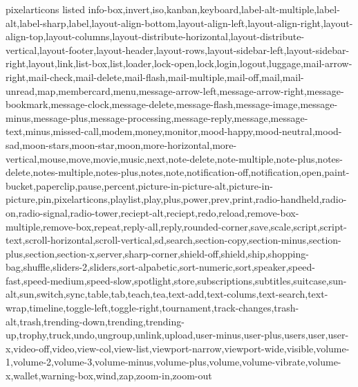 \documentclass[aspectratio=169,t]{beamer}
\begin{document}
\begin{frame}[allowframebreaks]{pixelarticons listed}
{info-box,invert,iso,kanban,keyboard,label-alt-multiple,label-alt,label-sharp,label,layout-align-bottom,layout-align-left,layout-align-right,layout-align-top,layout-columns,layout-distribute-horizontal,layout-distribute-vertical,layout-footer,layout-header,layout-rows,layout-sidebar-left,layout-sidebar-right,layout,link,list-box,list,loader,lock-open,lock,login,logout,luggage,mail-arrow-right,mail-check,mail-delete,mail-flash,mail-multiple,mail-off,mail,mail-unread,map,membercard,menu,message-arrow-left,message-arrow-right,message-bookmark,message-clock,message-delete,message-flash,message-image,message-minus,message-plus,message-processing,message-reply,message,message-text,minus,missed-call,modem,money,monitor,mood-happy,mood-neutral,mood-sad,moon-stars,moon-star,moon,more-horizontal,more-vertical,mouse,move,movie,music,next,note-delete,note-multiple,note-plus,notes-delete,notes-multiple,notes-plus,notes,note,notification-off,notification,open,paint-bucket,paperclip,pause,percent,picture-in-picture-alt,picture-in-picture,pin,pixelarticons,playlist,play,plus,power,prev,print,radio-handheld,radio-on,radio-signal,radio-tower,reciept-alt,reciept,redo,reload,remove-box-multiple,remove-box,repeat,reply-all,reply,rounded-corner,save,scale,script,script-text,scroll-horizontal,scroll-vertical,sd,search,section-copy,section-minus,section-plus,section,section-x,server,sharp-corner,shield-off,shield,ship,shopping-bag,shuffle,sliders-2,sliders,sort-alpabetic,sort-numeric,sort,speaker,speed-fast,speed-medium,speed-slow,spotlight,store,subscriptions,subtitles,suitcase,sun-alt,sun,switch,sync,table,tab,teach,tea,text-add,text-colums,text-search,text-wrap,timeline,toggle-left,toggle-right,tournament,track-changes,trash-alt,trash,trending-down,trending,trending-up,trophy,truck,undo,ungroup,unlink,upload,user-minus,user-plus,users,user,user-x,video-off,video,view-col,view-list,viewport-narrow,viewport-wide,visible,volume-1,volume-2,volume-3,volume-minus,volume-plus,volume,volume-vibrate,volume-x,wallet,warning-box,wind,zap,zoom-in,zoom-out
} {}
\end{frame}
\end{document}
